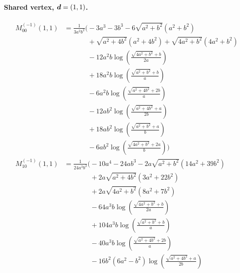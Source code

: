 \paragraph{Shared vertex, $\vb*{d}=(1,1)$.}
\begin{align*}
M^{(-1)}_{00}(1,1) &= \frac{1}{3 a^{2} b^{2}}\Bigg(- 3 a^{3} - 3 b^{3} - 6 \sqrt{a^{2} + b^{2}}\left(a^{2} + b^{2}\right)\\
&\phantom{{}=\frac{1}{3 a^{2} b^{2}}\Bigg(}+ \sqrt{a^{2} + 4 b^{2}}\left(a^{2} + 4 b^{2}\right) + \sqrt{4 a^{2} + b^{2}}\left(4 a^{2} + b^{2}\right)\\
&\phantom{{}=\frac{1}{3 a^{2} b^{2}}\Bigg(}- 12 a^{2} b \log\left(\frac{\sqrt{4 a^{2} + b^{2}} + b}{2 a}\right)\\
&\phantom{{}=\frac{1}{3 a^{2} b^{2}}\Bigg(}+ 18 a^{2} b \log\left(\frac{\sqrt{a^{2} + b^{2}} + b}{a}\right)\\
&\phantom{{}=\frac{1}{3 a^{2} b^{2}}\Bigg(}- 6 a^{2} b \log\left(\frac{\sqrt{a^{2} + 4 b^{2}} + 2 b}{a}\right)\\
&\phantom{{}=\frac{1}{3 a^{2} b^{2}}\Bigg(}- 12 a b^{2} \log\left(\frac{\sqrt{a^{2} + 4 b^{2}} + a}{2 b}\right)\\
&\phantom{{}=\frac{1}{3 a^{2} b^{2}}\Bigg(}+ 18 a b^{2} \log\left(\frac{\sqrt{a^{2} + b^{2}} + a}{b}\right)\\
&\phantom{{}=\frac{1}{3 a^{2} b^{2}}\Bigg(}- 6 a b^{2} \log\left(\frac{\sqrt{4 a^{2} + b^{2}} + 2 a}{b}\right)\Bigg)\\[1.2ex]
M^{(-1)}_{10}(1,1) &= \frac{1}{24 a^{3} b^{2}}\Bigg(- 10 a^{4} - 24 a b^{3} - 2 a \sqrt{a^{2} + b^{2}}\left(14 a^{2} + 39 b^{2}\right)\\
&\phantom{{}=\frac{1}{24 a^{3} b^{2}}\Bigg(}+ 2 a \sqrt{a^{2} + 4 b^{2}}\left(3 a^{2} + 22 b^{2}\right)\\
&\phantom{{}=\frac{1}{24 a^{3} b^{2}}\Bigg(}+ 2 a \sqrt{4 a^{2} + b^{2}}\left(8 a^{2} + 7 b^{2}\right)\\
&\phantom{{}=\frac{1}{24 a^{3} b^{2}}\Bigg(}- 64 a^{3} b \log\left(\frac{\sqrt{4 a^{2} + b^{2}} + b}{2 a}\right)\\
&\phantom{{}=\frac{1}{24 a^{3} b^{2}}\Bigg(}+ 104 a^{3} b \log\left(\frac{\sqrt{a^{2} + b^{2}} + b}{a}\right)\\
&\phantom{{}=\frac{1}{24 a^{3} b^{2}}\Bigg(}- 40 a^{3} b \log\left(\frac{\sqrt{a^{2} + 4 b^{2}} + 2 b}{a}\right)\\
&\phantom{{}=\frac{1}{24 a^{3} b^{2}}\Bigg(}- 16 b^{2} \left(6 a^{2} - b^{2}\right) \log\left(\frac{\sqrt{a^{2} + 4 b^{2}} + a}{2 b}\right)\\

\end{align*}
